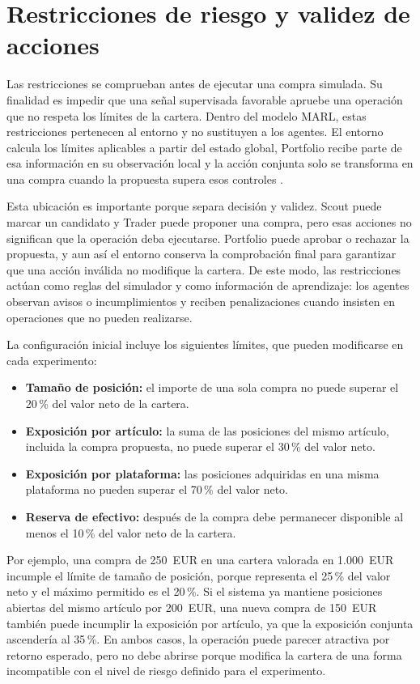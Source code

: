 \section{Restricciones de riesgo y validez de acciones}
\label{sec:restricciones-riesgo}

Las restricciones se comprueban antes de ejecutar una compra simulada. Su finalidad es impedir que una señal supervisada favorable apruebe una operación que no respeta los límites de la cartera. Dentro del modelo MARL, estas restricciones pertenecen al entorno y no sustituyen a los agentes. El entorno calcula los límites aplicables a partir del estado global, Portfolio recibe parte de esa información en su observación local y la acción conjunta solo se transforma en una compra cuando la propuesta supera esos controles \cite{markowitz1952portfolio,liu2021finrl}.

Esta ubicación es importante porque separa decisión y validez. Scout puede marcar un candidato y Trader puede proponer una compra, pero esas acciones no significan que la operación deba ejecutarse. Portfolio puede aprobar o rechazar la propuesta, y aun así el entorno conserva la comprobación final para garantizar que una acción inválida no modifique la cartera. De este modo, las restricciones actúan como reglas del simulador y como información de aprendizaje: los agentes observan avisos o incumplimientos y reciben penalizaciones cuando insisten en operaciones que no pueden realizarse.

La configuración inicial incluye los siguientes límites, que pueden modificarse en cada experimento:

\begin{itemize}
  \item \textbf{Tamaño de posición:} el importe de una sola compra no puede superar el 20\,\% del valor neto de la cartera.
  \item \textbf{Exposición por artículo:} la suma de las posiciones del mismo artículo, incluida la compra propuesta, no puede superar el 30\,\% del valor neto.
  \item \textbf{Exposición por plataforma:} las posiciones adquiridas en una misma plataforma no pueden superar el 70\,\% del valor neto.
  \item \textbf{Reserva de efectivo:} después de la compra debe permanecer disponible al menos el 10\,\% del valor neto de la cartera.
\end{itemize}

Por ejemplo, una compra de 250~EUR en una cartera valorada en 1.000~EUR incumple el límite de tamaño de posición, porque representa el 25\,\% del valor neto y el máximo permitido es el 20\,\%. Si el sistema ya mantiene posiciones abiertas del mismo artículo por 200~EUR, una nueva compra de 150~EUR también puede incumplir la exposición por artículo, ya que la exposición conjunta ascendería al 35\,\%. En ambos casos, la operación puede parecer atractiva por retorno esperado, pero no debe abrirse porque modifica la cartera de una forma incompatible con el nivel de riesgo definido para el experimento.

